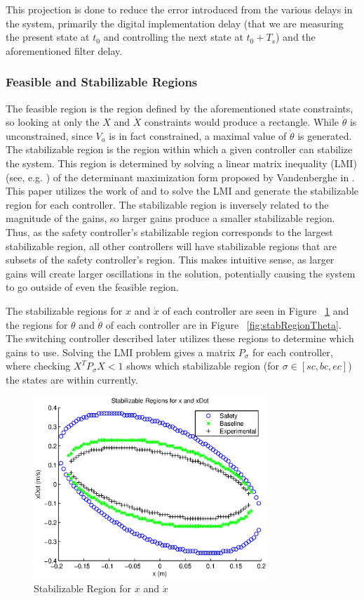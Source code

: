 \documentclass[conference]{IEEEtran}
\begin{document}
This projection is done to reduce the error introduced from the various delays in the system, primarily the digital implementation delay (that we are measuring the present state at $t_0$ and controlling the next state at $t_0+T_s$) and the aforementioned filter delay.

\subsubsection{Feasible and Stabilizable Regions}

The feasible region is the region defined by the aforementioned state constraints, so looking at only the $X$ and $\dot{X}$ constraints would produce a rectangle.  While $\dot{\theta}$ is unconstrained, since $V_a$ is in fact constrained, a maximal value of $\dot{\theta}$ is generated.  The stabilizable region is the region within which a given controller can stabilize the system.  This region is determined by solving a linear matrix inequality (LMI) (see, e.g. \cite{Boyd94}) of the determinant maximization form proposed by Vandenberghe in \cite{Vand98}.  This paper utilizes the work of \cite{Yalmip} and \cite{Sdpt3} to solve the LMI and generate the stabilizable region for each controller.  The stabilizable region is inversely related to the magnitude of the gains, so larger gains produce a smaller stabilizable region.  Thus, as the safety controller's stabilizable region corresponds to the largest stabilizable region, all other controllers will have stabilizable regions that are subsets of the safety controller's region.  This makes intuitive sense, as larger gains will create larger oscillations in the solution, potentially causing the system to go outside of even the feasible region.

The stabilizable regions for $x$ and $\dot{x}$ of each controller are seen in Figure ~\ref{fig:stabRegionX} and the regions for $\theta$ and $\dot{\theta}$ of each controller are in Figure ~\ref{fig:stabRegionTheta}.  The switching controller described later utilizes these regions to determine which gains to use.  Solving the LMI problem gives a matrix $P_{\sigma}$ for each controller, where checking $X^TP_{\sigma}X<1$ shows which stabilizable region (for $\sigma\in\left[sc,bc,ec\right]$) the states are within currently.

\begin{figure}[htp]
\centering
\includegraphics[width=250pt]{stabRegionX}
\caption{Stabilizable Region for $x$ and $\dot{x}$}\label{fig:stabRegionX}
\end{figure}
\end{document}
